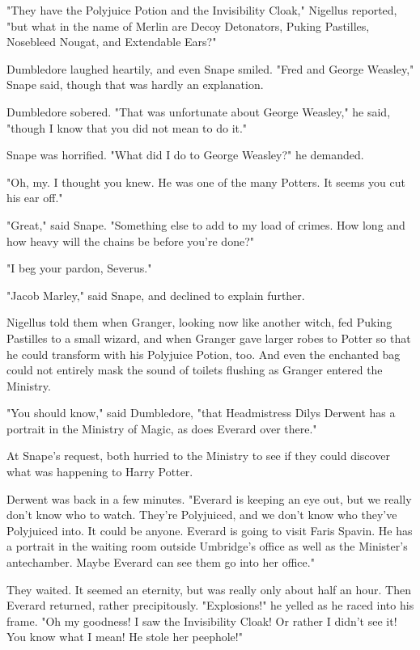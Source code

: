 "They have the Polyjuice Potion and the Invisibility Cloak," Nigellus reported, "but what in the name of Merlin are Decoy Detonators, Puking Pastilles, Nosebleed Nougat, and Extendable Ears?"

Dumbledore laughed heartily, and even Snape smiled. "Fred and George Weasley," Snape said, though that was hardly an explanation.

Dumbledore sobered. "That was unfortunate about George Weasley," he said, "though I know that you did not mean to do it."

Snape was horrified. "What did I do to George Weasley?" he demanded.

"Oh, my. I thought you knew. He was one of the many Potters. It seems you cut his ear off."

"Great," said Snape. "Something else to add to my load of crimes. How long and how heavy will the chains be before you're done?"

"I beg your pardon, Severus."

"Jacob Marley," said Snape, and declined to explain further.

Nigellus told them when Granger, looking now like another witch, fed Puking Pastilles to a small wizard, and when Granger gave larger robes to Potter so that he could transform with his Polyjuice Potion, too. And even the enchanted bag could not entirely mask the sound of toilets flushing as Granger entered the Ministry.

"You should know," said Dumbledore, "that Headmistress Dilys Derwent has a portrait in the Ministry of Magic, as does Everard over there."

At Snape's request, both hurried to the Ministry to see if they could discover what was happening to Harry Potter.

Derwent was back in a few minutes. "Everard is keeping an eye out, but we really don't know who to watch. They're Polyjuiced, and we don't know who they've Polyjuiced into. It could be anyone. Everard is going to visit Faris Spavin. He has a portrait in the waiting room outside Umbridge's office as well as the Minister's antechamber. Maybe Everard can see them go into her office."

They waited. It seemed an eternity, but was really only about half an hour. Then Everard returned, rather precipitously. "Explosions!" he yelled as he raced into his frame. "Oh my goodness! I saw the Invisibility Cloak! Or rather I didn't see it! You know what I mean! He stole her peephole!"

